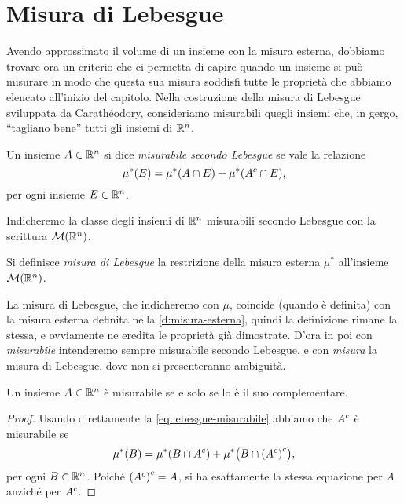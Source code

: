 \section{Misura di Lebesgue}
\label{sec:misura-lebesgue}
Avendo approssimato il volume di un insieme con la misura esterna, dobbiamo trovare ora un criterio che ci permetta di capire quando un insieme si può misurare in modo che questa sua misura soddisfi tutte le proprietà che abbiamo elencato all'inizio del capitolo.
Nella costruzione della misura di Lebesgue sviluppata da Carath\'eodory, consideriamo misurabili quegli insiemi che, in gergo, ``tagliano bene'' tutti gli insiemi di $\mathbb{R}^n$.
\begin{definizione} \label{d:lebesgue-misurabile}
	Un insieme $A\in\mathbb{R}^n$ si dice \emph{misurabile secondo Lebesgue} se vale la relazione
	\begin{equation}
		\mu^*(E)=\mu^*(A\cap E)+\mu^*({A}^c\cap E),
		\label{eq:lebesgue-misurabile}
	\end{equation}
	per ogni insieme $E\in\mathbb{R}^n$.
\end{definizione}
Indicheremo la classe degli insiemi di $\mathbb{R}^n$ misurabili secondo Lebesgue con la scrittura $\mathcal M(\mathbb{R}^n)$.
\begin{definizione} \label{d:misura-lebesgue}
	Si definisce \emph{misura di Lebesgue} la restrizione della misura esterna $\mu^*$ all'insieme $\mathcal M(\mathbb{R}^n)$.
\end{definizione}
La misura di Lebesgue, che indicheremo con $\mu$, coincide (quando è definita) con la misura esterna definita nella \ref{d:misura-esterna}, quindi la definizione rimane la stessa, e ovviamente ne eredita le proprietà già dimostrate.
D'ora in poi con \emph{misurabile} intenderemo sempre misurabile secondo Lebesgue, e con \emph{misura} la misura di Lebesgue, dove non si presenteranno ambiguità.
\begin{proprieta} \label{pr:complementare-misurabile}
	Un insieme $A\in\mathbb{R}^n$ è misurabile se e solo se lo è il suo complementare.
\end{proprieta}
\begin{proof}
	Usando direttamente la \eqref{eq:lebesgue-misurabile} abbiamo che ${A}^c$ è misurabile se
	\begin{equation}
		\mu^*(B)=\mu^*(B\cap{A}^c)+\mu^*\big(B\cap{({A}^c)}^c\big),
	\end{equation}
	per ogni $B\in\mathbb{R}^n$.
Poich\'e ${({A}^c)}^c=A$, si ha esattamente la stessa equazione per $A$ anzich\'e per ${A}^c$.
\end{proof}
